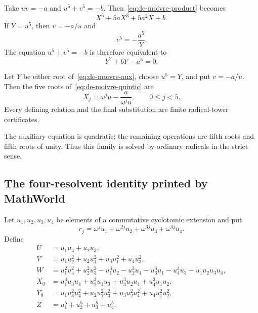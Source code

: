 Take \(uv=-a\) and \(u^5+v^5=-b\).  Then~\eqref{eq:de-moivre-product} becomes
\begin{equation}\label{eq:de-moivre-quintic}
 X^5+5aX^3+5a^2X+b.
\end{equation}
If \(Y=u^5\), then \(v=-a/u\) and
\[
 v^5=-\frac{a^5}{Y}.
\]
The equation \(u^5+v^5=-b\) is therefore equivalent to
\begin{equation}\label{eq:de-moivre-aux}
 Y^2+bY-a^5=0.
\end{equation}

\begin{corollary}
\label{cor:de-moivre-roots}
Let \(Y\) be either root of~\eqref{eq:de-moivre-aux}, choose \(u^5=Y\), and
put \(v=-a/u\).  Then the five roots of~\eqref{eq:de-moivre-quintic} are
\begin{equation}\label{eq:de-moivre-roots}
 X_j=\omega^ju-\frac{a}{\omega^ju},
 \qquad 0\le j<5.
\end{equation}
Every defining relation and the final substitution are finite radical-tower
certificates.
\end{corollary}

The auxiliary equation is quadratic; the remaining operations are fifth roots
and fifth roots of unity.  Thus this family is solved by ordinary radicals in
the strict sense.

\subsection{The four-resolvent identity printed by MathWorld}

Let \(u_1,u_2,u_3,u_4\) be elements of a commutative cyclotomic extension and
put
\begin{equation}\label{eq:four-resolvent-roots}
 r_j=\omega^ju_1+\omega^{2j}u_2+\omega^{3j}u_3+\omega^{4j}u_4.
\end{equation}
Define
\begin{align*}
 U&=u_1u_4+u_2u_3,\\
 V&=u_1u_2^2+u_2u_4^2+u_3u_1^2+u_4u_3^2,\\
 W&=u_1^2u_4^2+u_2^2u_3^2-u_1^3u_2-u_2^3u_4-u_3^3u_1-u_4^3u_3
     -u_1u_2u_3u_4,\\
 X_0&=u_1^3u_3u_4+u_2^3u_1u_3+u_3^3u_2u_4+u_4^3u_1u_2,\\
 Y_0&=u_1u_3^2u_4^2+u_2u_1^2u_3^2+u_3u_2^2u_4^2+u_4u_1^2u_2^2,\\
 Z&=u_1^5+u_2^5+u_3^5+u_4^5.
\end{align*}

